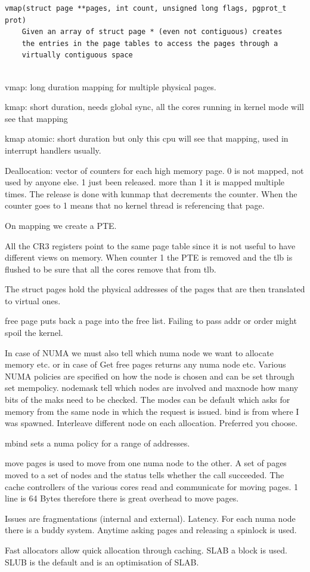 \documentclass[twoside]{article}
\begin{document}
\begin{verbatim}
vmap(struct page **pages, int count, unsigned long flags, pgprot_t prot)
    Given an array of struct page * (even not contiguous) creates
    the entries in the page tables to access the pages through a
    virtually contiguous space


\end{verbatim}

vmap: long duration mapping for multiple physical pages.

kmap: short duration, needs global sync, all the cores running in kernel mode will see that mapping

kmap atomic: short duration but only this cpu will see that mapping, used in interrupt handlers usually. 

Deallocation: vector of counters for each high memory page. 0 is not mapped, not used by anyone else. 1 just been released. more than 1 it is mapped multiple times. The release is done with kunmap that decrements the counter. When the counter goes to 1 means that no kernel thread is referencing that page.

On mapping we create a PTE.

All the CR3 registers point to the same page table since it is not useful to have different views on memory. When counter 1 the PTE is removed and the tlb is flushed to be sure that all the cores remove that from tlb. 

The struct pages hold the physical addresses of the pages that are then translated to virtual ones.

free page puts back a page into the free list. Failing to pass addr or order might spoil the kernel.


In case of NUMA we must also tell which numa node we want to allocate memory etc. or in case of Get free pages returns any numa node etc. Various NUMA policies are specified on how the node is chosen and can be set through set mempolicy. nodemask tell which nodes are involved and maxnode how many bits of the maks need to be checked. The modes can be default which asks for memory from the same node in which the request is issued. bind is from where I was spawned. Interleave different node on each allocation. Preferred you choose.

mbind sets a numa policy for a range of addresses.

move pages is used to move from one numa node to the other. A set of pages moved to a set of nodes and the status tells whether the call succeeded. The cache controllers of the various cores read and communicate for moving pages. 1 line is 64 Bytes therefore there is great overhead to move pages.

Issues are fragmentations (internal and external). Latency. For each numa node there is a buddy system. Anytime asking pages and releasing a spinlock is used.

Fast allocators allow quick allocation through caching. SLAB a block is used. SLUB is the default and is an optimisation of SLAB.

\newpage


\end{document}
